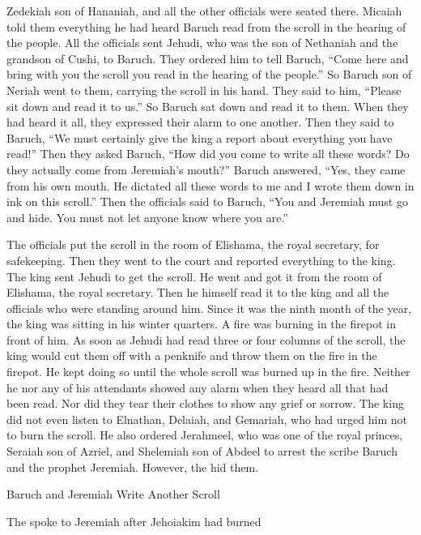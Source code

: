 {Zedekiah
son
of Hananiah,
and all
the other officials were seated there.
Micaiah
told
them
everything
he had
heard
Baruch
read
from the scroll
in the hearing
of the people.
All
the officials
sent
Jehudi,
who was the son
of Nethaniah
and the grandson
of Cushi,
to Baruch.
They ordered
him to tell Baruch, “Come
here and bring
with you the scroll
you read
in the hearing
of the people.”
So Baruch
son
of Neriah
went
to
them, carrying
the scroll
in his hand.
They said
to
him, “Please
sit down
and read
it to us.” So Baruch
sat down and read
it to them.
When
they had heard
it all,
they expressed
their alarm
to
one
another.
Then they said
to
Baruch,
“We must certainly give the king
a report about everything
you have read!”
Then
they asked
Baruch,
“How
did you come to write
all
these
words? Do they actually come from Jeremiah’s mouth?”
Baruch
answered,
“Yes, they came from his own mouth.
He dictated
all
these
words
to me and I
wrote
them down in ink
on
this scroll.”
Then the officials
said
to Baruch,
“You
and Jeremiah
must go
and hide.
You
must not
let anyone
know
where
you are.”
\par }{\PP {}The officials put the scroll
in the room
of Elishama,
the royal secretary,
for safekeeping.
Then they went
to
the court
and reported everything
to the
king.
The king
sent
Jehudi
to get
the scroll.
He went and got
it from the room
of Elishama,
the royal secretary.
Then he
himself read
it to the king
and all
the officials
who were standing
around him.
Since it was the ninth
month
of the
year, the king
was sitting
in his winter
quarters.
A fire was burning
in the firepot
in front of him.
As soon as
Jehudi
had read
three
or four
columns
of the scroll, the king would cut
them off
with
a penknife
and throw
them on the fire
in
the firepot.
He kept doing so until
the whole
scroll
was burned up
in
the fire.
Neither
he nor any of his attendants
showed any alarm
when they heard
all
that had
been read. Nor did they tear
their clothes
to show any
grief
or sorrow.
The king
did not even
listen to
Elnathan,
Delaiah,
and Gemariah,
who had urged
him not to burn
the scroll.
He also ordered
Jerahmeel,
who was one of the royal
princes, Seraiah
son
of Azriel,
and Shelemiah
son
of Abdeel
to arrest
the scribe
Baruch
and the
prophet
Jeremiah.
However, the
{}
hid them.
\par }{\SH Baruch and Jeremiah Write Another Scroll
\par }{\PP {}The
{}
spoke
to
Jeremiah
after
Jehoiakim had burned
}
